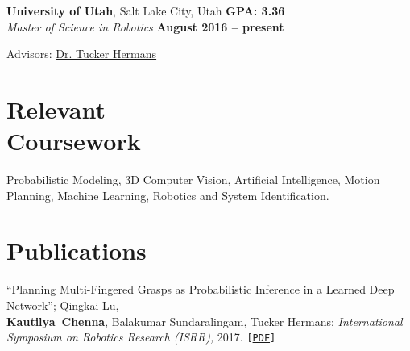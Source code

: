 \documentclass[letterpaper, margin, line]{resume}
\begin{document}
\begin{resume}
    \textbf{University of Utah}, Salt Lake City, Utah \hfill \textbf{GPA: 3.36}
    \vspace{0.5mm}\\\vspace{1mm}%
    \textsl{Master of Science in Robotics} \hfill \textbf{ August 2016 -- present}\vspace{-3mm}\\\vspace{-1mm}%
    \begin{list2}
        \item Advisors:  \href{https://www.cs.utah.edu/~thermans/}{Dr. Tucker Hermans}
    \end{list2}\vspace{-1.5mm}
	
	\section{\mysidestyle Relevant\\Coursework}
	Probabilistic Modeling, 3D Computer Vision, Artificial Intelligence, Motion Planning, Machine Learning, Robotics and System Identification.\vspace{-1mm}%
    
    
    \section{\mysidestyle Publications}
     ``Planning Multi-Fingered Grasps as Probabilistic Inference in a Learned Deep Network''; Qingkai Lu, \\
     \mbox{\bf Kautilya Chenna}, Balakumar Sundaralingam, Tucker Hermans; \textit{International Symposium on Robotics Research (ISRR),} 2017. \texttt{[\href{http://www.cs.utah.edu/~thermans/papers/lu-isrr2017-deep-multifinger-grasping.pdf}{PDF}]}
     \vspace{-1mm}%


\end{resume}
\end{document}
